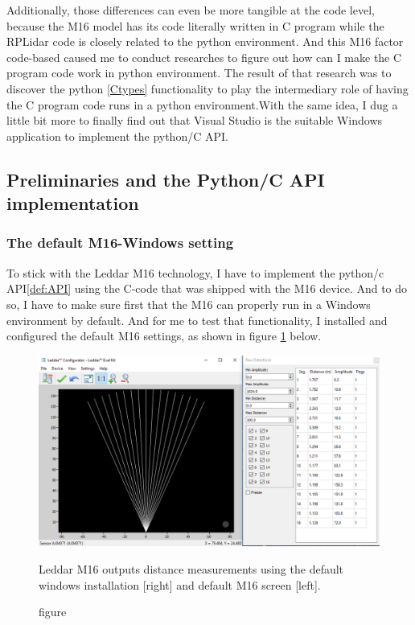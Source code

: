 \documentclass[onecolumn, draftclsnofoot,10pt, compsoc]{IEEEtran}
\begin{document}
\begin{singlespace}
Additionally, those differences can even be more tangible at the code level, because the M16 model has its code literally written in C program while the RPLidar code is closely related to the python environment. And this M16 factor code-based caused me to conduct researches to figure out how can I make the C program code work in python environment. The result of that research was to discover the python \ref{Ctypes} functionality to play the intermediary role of having the C program code runs in a python environment.With the same idea, I dug a little bit more to finally find out that Visual Studio is the suitable Windows application to implement the python/C API.  

 
\subsection{ Preliminaries and the Python/C API implementation}
	\subsubsection{The default M16-Windows setting}
To stick with the Leddar M16 technology, I have to implement the python/c API\ref{def:API} using the C-code that was shipped with the M16 device. And to do so, I have to make sure first that  the M16 can properly run in a Windows environment by default. And for me to test that functionality, I installed and configured the default M16 settings, as shown in figure \ref{signal} below.

   \begin{figure}[H]
			\includegraphics[scale=0.5]{images/signal.PNG}
			\caption{figure}{Leddar M16 outputs distance measurements  using the default windows installation [right] and default M16 screen [left].}
			\label{signal}
		\end{figure}
		

\end{singlespace}
\end{document}
